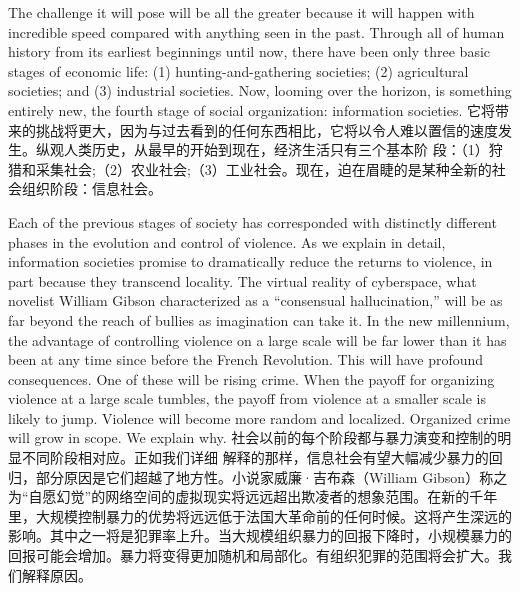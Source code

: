 \begin{paracol}{2}[]
The challenge it will pose will be all the greater because it will happen with incredible speed compared with anything seen in the past. Through all of human history from its earliest beginnings until now, there have been only three basic stages of economic life: (1) hunting-and-gathering societies; (2) agricultural societies; and (3) industrial societies. Now, looming over the horizon, is something entirely new, the fourth stage of social organization: information societies.
\switchcolumn
它将带来的挑战将更大，因为与过去看到的任何东西相比，它将以令人难以置信的速度发生。纵观人类历史，从最早的开始到现在，经济生活只有三个基本阶
段：（1）狩猎和采集社会;（2）农业社会;（3）工业社会。现在，迫在眉睫的是某种全新的社会组织阶段：信息社会。
\end{paracol}

\begin{paracol}{2}[]
Each of the previous stages of society has corresponded with distinctly different phases in the evolution and control of violence. As we explain in detail, information societies promise to dramatically reduce the returns to violence, in part because they transcend locality. The virtual reality of cyberspace, what novelist William Gibson characterized as a “consensual hallucination,” will be as far beyond the reach of bullies as imagination can take it. In the new
millennium, the advantage of controlling violence on a large scale will be far lower than it has been at any time since before the French Revolution. This will have profound consequences. One of these will be rising crime. When the payoff for organizing violence at a large scale tumbles, the payoff from violence at a smaller scale is likely to jump. Violence will become more random and localized. Organized crime will grow in scope. We explain why.
\switchcolumn
社会以前的每个阶段都与暴力演变和控制的明显不同阶段相对应。正如我们详细 解释的那样，信息社会有望大幅减少暴力的回归，部分原因是它们超越了地方性。小说家威廉·吉布森（William Gibson）称之为“自愿幻觉”的网络空间的虚拟现实将远远超出欺凌者的想象范围。在新的千年里，大规模控制暴力的优势将远远低于法国大革命前的任何时候。这将产生深远的影响。其中之一将是犯罪率上升。当大规模组织暴力的回报下降时，小规模暴力的回报可能会增加。暴力将变得更加随机和局部化。有组织犯罪的范围将会扩大。我们解释原因。
\end{paracol}

